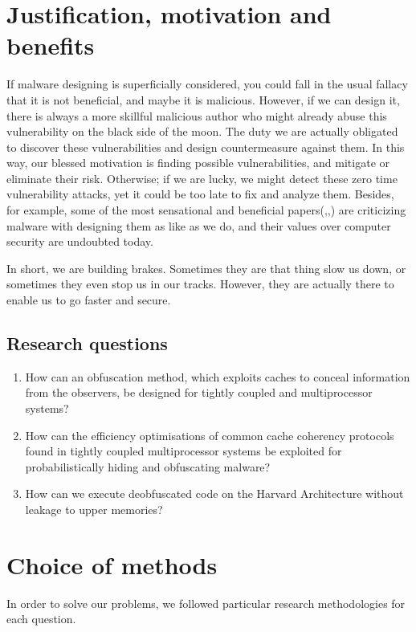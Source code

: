 \section{Justification, motivation and benefits}
If malware designing is superficially considered, you could fall in the usual fallacy that it is not beneficial, and maybe it is malicious. However, if we can design it, there is always a more skillful malicious author who might already abuse this vulnerability on the black side of the moon. The duty we are actually obligated to discover these vulnerabilities and design countermeasure against them. In this way, our blessed motivation is finding possible vulnerabilities, and mitigate or eliminate their risk. Otherwise; if we are lucky, we might detect these zero time vulnerability attacks, yet it could be too late to fix and analyze them. Besides, for example, some of the most sensational and beneficial papers(\cite{moser2007limits},\cite{cavallaro2008limits},\cite{egele2012survey}) are criticizing malware with designing them as like as we do, and their values over computer security are undoubted today. 

In short, we are building brakes. Sometimes they are that thing slow us down, or sometimes they even stop us in our tracks. However, they are actually there to enable us to go faster and secure.

\subsection{Research questions}\label{research:questions}
\begin{enumerate}
	\item How can an obfuscation method, which exploits caches to conceal information from the observers, be designed for tightly coupled and multiprocessor systems?
	\item How can the efficiency optimisations of common cache coherency protocols found in tightly coupled multiprocessor systems be exploited for probabilistically hiding and obfuscating malware?
	\item How can we execute deobfuscated code on the Harvard Architecture without leakage to upper memories?
\end{enumerate}


\section{Choice of methods}
	In order to solve our problems, we followed particular research methodologies for each question.

